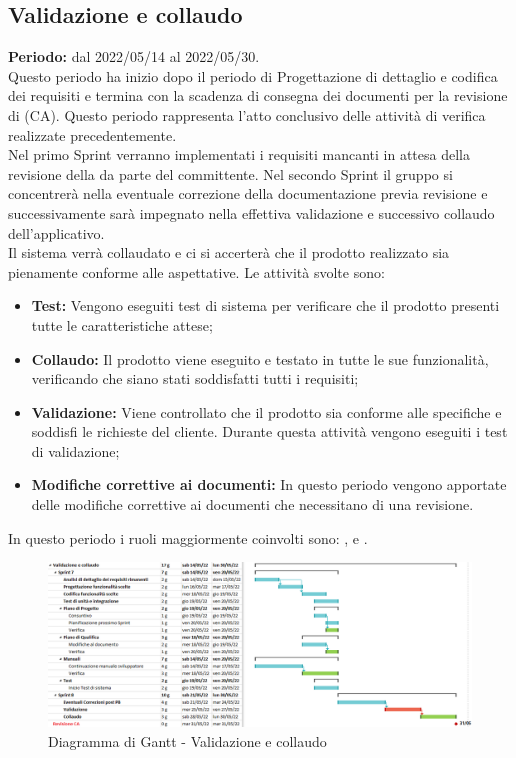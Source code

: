 
\subsection{Validazione e collaudo} \label{subsection:pianificazione_validazione}
\textbf{Periodo:} dal 2022/05/14 al 2022/05/30.
\bigskip
\\Questo periodo ha inizio dopo il periodo di Progettazione di dettaglio e codifica dei requisiti e termina con la scadenza di consegna dei documenti per la revisione di \CA{} (CA\glo{}).
Questo periodo rappresenta l'atto conclusivo delle attività di verifica realizzate precedentemente.
\\Nel primo Sprint\glo{} verranno implementati i requisiti mancanti in attesa della revisione della \PB{} da parte del committente.
Nel secondo Sprint\glo{} il gruppo si concentrerà nella eventuale correzione della documentazione previa revisione e successivamente sarà impegnato nella effettiva validazione e successivo collaudo dell'applicativo.
\\Il sistema verrà collaudato e ci si accerterà che il prodotto realizzato sia pienamente conforme alle aspettative.
Le attività svolte sono:
\begin{itemize}
  \item \textbf{Test:} Vengono eseguiti test di sistema per verificare che il prodotto presenti tutte le caratteristiche attese;
  \item \textbf{Collaudo:} Il prodotto viene eseguito e testato in tutte le sue funzionalità, verificando che siano stati soddisfatti tutti i requisiti;
  \item \textbf{Validazione:} Viene controllato che il prodotto sia conforme alle specifiche e soddisfi le richieste del cliente.
        Durante questa attività vengono eseguiti i test di validazione;
  \item \textbf{Modifiche correttive ai documenti:} In questo periodo vengono apportate delle modifiche correttive ai documenti che necessitano di una revisione.
\end{itemize}
In questo periodo i ruoli maggiormente coinvolti sono: \roleDesignerLow{}, \roleProgrammerLow{} e \roleVerifierLow{}.
\bigskip
\begin{figure}[H]
  \centering
  \includegraphics[scale=0.55]{immagini/validazione_collaudo.png}
  \caption{Diagramma di Gantt - Validazione e collaudo}
\end{figure}
\pagebreak